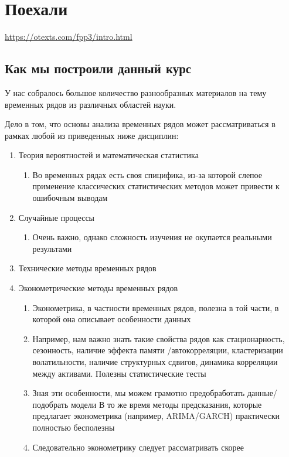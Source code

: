 \chapter{Поехали}
\url{https://otexts.com/fpp3/intro.html}

\section{Как мы построили данный курс}

У нас собралось большое количество разнообразных материалов на
тему
временных рядов из различных областей науки.

Дело в том, что основы анализа временных рядов может рассматриваться
в рамках любой из приведенных ниже дисциплин:
\begin{enumerate}
  \item Теория вероятностей и математическая статистика
    \begin{enumerate}
      \item Во временных рядах есть своя спицифика, из-за которой
        слепое применение классических статистических методов может
        привести к ошибочным выводам
    \end{enumerate}
  \item Случайные процессы
    \begin{enumerate}
      \item Очень важно, однако сложность изучения не окупается
        реальными результами
    \end{enumerate}
  \item Технические методы временных рядов
  \item Эконометрические методы временных рядов
    \begin{enumerate}
      \item Эконометрика, в частности временных рядов, полезна в той части, в
        которой она описывает особенности данных
      \item Например, нам важно знать такие свойства рядов как стационарность,
        сезонность, наличие эффекта памяти /автокорреляции, кластеризации
        волатильности, наличие структурных сдвигов, динамика корреляции между
        активами. Полезны статистические тесты
      \item Зная эти особенности, мы можем грамотно предобработать
        данные/подобрать модели
        В то же время методы предсказания, которые предлагает эконометрика
        (например, ARIMA/GARCH) практически полностью бесполезны
      \item Следовательно эконометрику следует рассматривать скорее

\end{enumerate}
\end{enumerate}

